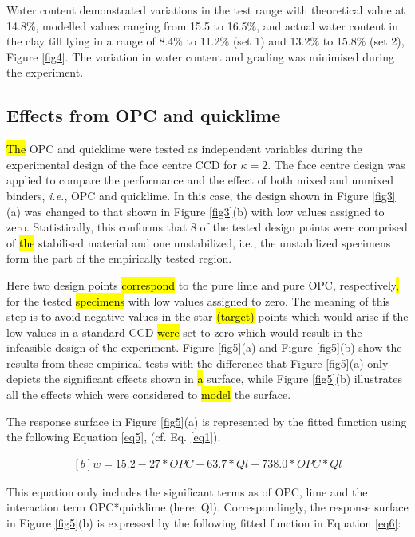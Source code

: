 \documentclass[eprint,
]{actapoly}
\begin{document}
Water content demonstrated variations in the test range with theoretical value at 14.8\%, modelled values ranging from 15.5 to 16.5\%, and actual water content in the clay till lying in a range of 8.4\% to 11.2\% (set 1) and 13.2\% to 15.8\% (set 2), Figure \ref{fig4}. The variation in water content and grading was minimised during the experiment.

\subsection{Effects from OPC and quicklime}
\hl{The }OPC and quicklime were tested as independent variables during the  experimental design of the face centre CCD for $\kappa=2$. The face centre design was applied to compare the performance and the effect of both mixed and unmixed binders, \emph{i.e.}, OPC and quicklime. In this case, the design shown in Figure \ref{fig3}(a) was changed to that shown in Figure \ref{fig3}(b) with low values\hl{ }assigned to zero. Statistically, this conforms that 8 of the tested design points were comprised of \hl{the }stabilised material and one unstabilized, i.e., the unstabilized specimens form the part of the empirically tested region. 

Here two design points \hl{correspond }to the pure lime and pure OPC, respectively\hl{, }for the tested \hl{specimens }with low values assigned to zero. The meaning of this step is to avoid\hl{ }negative values in the star\hl{ (target) }points which would arise if the low values in a standard CCD \hl{were }set to zero which would result in the infeasible design of the experiment. Figure \ref{fig5}(a) and Figure \ref{fig5}(b) show\hl{ }the results from these empirical tests with the difference that\hl{ }Figure \ref{fig5}(a) only depicts the significant effects shown in \hl{a }surface, while\hl{ }Figure \ref{fig5}(b) illustrates all the effects which were considered to \hl{model }the surface. 

The response surface in Figure \ref{fig5}(a) is represented by the fitted function using the following Equation \ref{eq5}, (cf. Eq. \ref{eq1}). 

\begin{equation}\label{eq5}
\begin{aligned}[b]
w=15.2 -27*OPC-63.7*Ql+738.0*OPC*Ql 
\end{aligned}
\end{equation}

This equation only includes the significant terms as of OPC, lime and the interaction term OPC*quicklime (here: Ql). Correspondingly, the response surface in Figure \ref{fig5}(b) is expressed by the following fitted function in Equation \ref{eq6}:
\end{document}
